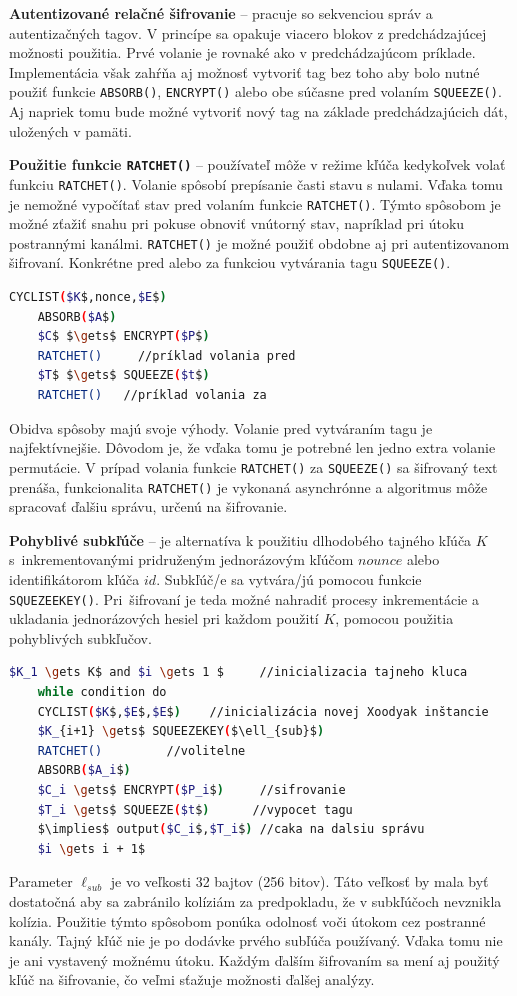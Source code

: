 \textbf{Autentizované relačné šifrovanie} -- pracuje so sekvenciou správ a autentizačných tagov. V princípe sa opakuje viacero blokov z predchádzajúcej možnosti použitia. Prvé volanie je rovnaké ako v predchádzajúcom príklade. Implementácia však zahŕňa aj možnosť vytvoriť tag bez toho aby bolo nutné použiť funkcie
\lstinline|ABSORB()|, \lstinline|ENCRYPT()| alebo obe súčasne pred volaním \lstinline|SQUEEZE()|. Aj napriek tomu bude možné vytvoriť nový tag na základe predchádzajúcich dát, uložených v pamäti. 	

\textbf{Použitie funkcie \lstinline|RATCHET()|} -- používateľ môže v režime kľúča kedykoľvek volať funkciu \lstinline|RATCHET()|. Volanie spôsobí prepísanie časti stavu s nulami. Vďaka tomu je nemožné vypočítať stav pred volaním funkcie \lstinline|RATCHET()|. Týmto spôsobom je možné zťažiť snahu pri pokuse obnoviť vnútorný stav, napríklad pri útoku postrannými kanálmi. \lstinline|RATCHET()| je možné použiť obdobne aj pri autentizovanom šifrovaní. Konkrétne pred alebo za funkciou vytvárania tagu \lstinline|SQUEEZE()|. 
\begin{lstlisting}[language=bash,mathescape=true]
	CYCLIST($K$,nonce,$E$)
	ABSORB($A$)
	$C$ $\gets$ ENCRYPT($P$)
	RATCHET()	  //príklad volania pred
	$T$ $\gets$ SQUEEZE($t$)
	RATCHET()   //príklad volania za
\end{lstlisting} 
Obidva spôsoby majú svoje výhody. Volanie pred vytváraním tagu je najfektívnejšie. Dôvodom je, že vďaka tomu je potrebné len jedno extra volanie permutácie. V prípad volania funkcie \lstinline|RATCHET()| za \lstinline|SQUEEZE()| sa šifrovaný text prenáša, funkcionalita \lstinline|RATCHET()| je vykonaná asynchrónne a algoritmus môže spracovať ďalšiu správu, určenú na šifrovanie. 

\textbf{Pohyblivé subkľúče} -- je alternatíva k použitiu dlhodobého tajného kľúča $K$ s~inkrementovanými pridruženým jednorázovým kľúčom $nounce$ alebo identifikátorom kľúča $id$. Subkľúč/e sa vytvára/jú pomocou funkcie \lstinline|SQUEZEEKEY()|. Pri~šifrovaní je teda možné nahradiť procesy inkrementácie a ukladania jednorázových hesiel pri každom použití  $K$, pomocou použitia pohyblivých subkľučov.

\begin{lstlisting}[language=bash,mathescape=true]
	$K_1 \gets K$ and $i \gets 1 $	   //inicializacia tajneho kluca
	while condition do 
	CYCLIST($K$,$E$,$E$)	//inicializácia novej Xoodyak inštancie
	$K_{i+1} \gets$ SQUEEZEKEY($\ell_{sub}$) 
	RATCHET()	      //volitelne
	ABSORB($A_i$)
	$C_i \gets$ ENCRYPT($P_i$)     //sifrovanie
	$T_i \gets$ SQUEEZE($t$)      //vypocet tagu
	$\implies$ output($C_i$,$T_i$) //caka na dalsiu správu
	$i \gets i + 1$
\end{lstlisting}     
Parameter $\ell_{sub}$ je vo veľkosti 32 bajtov (256 bitov). Táto veľkosť by mala byť dostatočná aby sa zabránilo kolíziám za predpokladu, že v subkľúčoch nevznikla kolízia. Použitie týmto spôsobom ponúka odolnosť voči útokom cez postranné kanály. Tajný kľúč nie je po dodávke prvého subľúča používaný. Vďaka tomu nie je ani vystavený možnému útoku. Každým ďalším šifrovaním sa mení aj použitý kľúč na šifrovanie, čo veľmi sťažuje možnosti ďalšej analýzy. 
 
